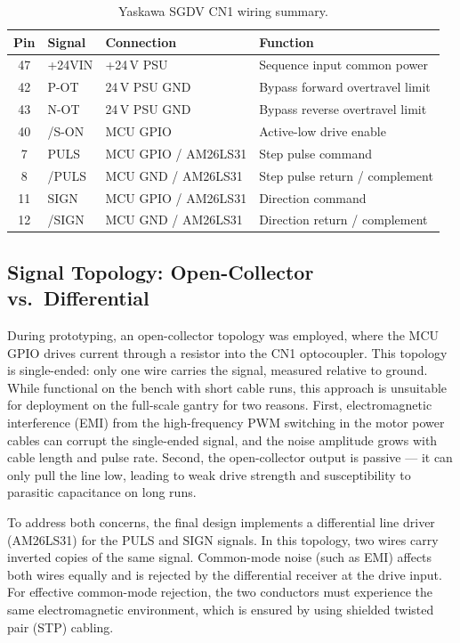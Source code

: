 \begin{table}[H]
    \centering
    \caption{Yaskawa SGDV CN1 wiring summary.}
    \label{tab:cn1_wiring}
    \renewcommand{\arraystretch}{1.2}
    \begin{tabular}{@{}clll@{}}
        \toprule
        \textbf{Pin} & \textbf{Signal} & \textbf{Connection} & \textbf{Function} \\
        \midrule
        47 & +24VIN & +24\,V PSU & Sequence input common power \\
        42 & P-OT & 24\,V PSU GND & Bypass forward overtravel limit \\
        43 & N-OT & 24\,V PSU GND & Bypass reverse overtravel limit \\
        40 & /S-ON & MCU GPIO & Active-low drive enable \\
        7  & PULS  & MCU GPIO / AM26LS31 & Step pulse command \\
        8  & /PULS & MCU GND / AM26LS31 & Step pulse return / complement \\
        11 & SIGN  & MCU GPIO / AM26LS31 & Direction command \\
        12 & /SIGN & MCU GND / AM26LS31 & Direction return / complement \\
        \bottomrule
    \end{tabular}
\end{table}

\subsection{Signal Topology: Open-Collector vs.\ Differential}

During prototyping, an open-collector topology was employed, where the MCU GPIO drives current through a resistor into the CN1 optocoupler. This topology is single-ended: only one wire carries the signal, measured relative to ground. While functional on the bench with short cable runs, this approach is unsuitable for deployment on the full-scale gantry for two reasons. First, electromagnetic interference (EMI) from the high-frequency PWM switching in the motor power cables can corrupt the single-ended signal, and the noise amplitude grows with cable length and pulse rate. Second, the open-collector output is passive --- it can only pull the line low, leading to weak drive strength and susceptibility to parasitic capacitance on long runs.

To address both concerns, the final design implements a differential line driver (AM26LS31) for the PULS and SIGN signals. In this topology, two wires carry inverted copies of the same signal. Common-mode noise (such as EMI) affects both wires equally and is rejected by the differential receiver at the drive input. For effective common-mode rejection, the two conductors must experience the same electromagnetic environment, which is ensured by using shielded twisted pair (STP) cabling.

